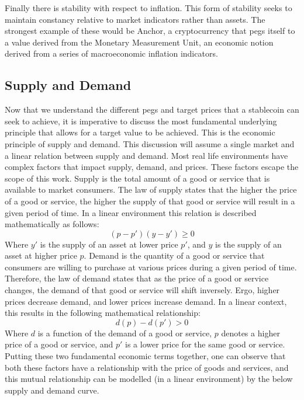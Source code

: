 \documentclass[bsc,frontabs,singlespacing,parskip,deptreport]{infthesis}
\begin{document}
    \smallbreak \noindent
    Finally there is stability with respect to inflation. This form of stability seeks to maintain constancy relative to market indicators rather than assets. The strongest example of these would be Anchor, a cryptocurrency that pegs itself to a value derived from the Monetary Measurement Unit, an economic notion derived from a series of macroeconomic inflation indicators. 
    \subsection{Supply and Demand}
    Now that we understand the different pegs and target prices that a stablecoin can seek to achieve, it is imperative to discuss the most fundamental underlying principle that allows for a target value to be achieved. This is the economic principle of supply and demand.
    This discussion will assume a single market and a linear relation between supply and demand. Most real life environments have complex factors that impact supply, demand, and prices. These factors escape the scope of this work. 
    \smallbreak \noindent
    Supply is the total amount of a good or service that is available to market consumers. The law of supply states that the higher the price of a good or service, the higher the supply of that good or service will result in a given period of time. In a linear environment this relation is described mathematically as follows: \[(p - p')(y - y')\geq 0\] Where \(y'\) is the supply of an asset at lower price \(p'\), and \(y\) is the supply of an asset at higher price \(p\).  
    \smallbreak \noindent
    Demand is the quantity of a good or service that consumers are willing to purchase at various prices during a given period of time. Therefore, the law of demand states that as the price of a good or service changes, the demand of that good or service will shift inversely. Ergo, higher prices decrease demand, and lower prices increase demand. In a linear context, this results in the following mathematical relationship: \[d(p) - d(p') > 0\] Where \(d\) is a function of the demand of a good or service, \(p\) denotes a higher price of a good or service, and \(p'\) is a lower price for the same good or service. Putting these two fundamental economic terms together, one can observe that both these factors have a relationship with the price of goods and services, and this mutual relationship can be modelled (in a linear environment) by the below supply and demand curve. 
\end{document}
